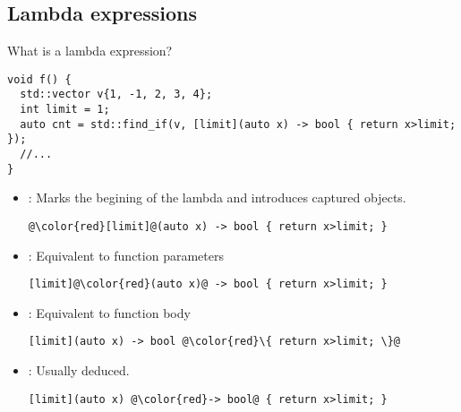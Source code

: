 \subsection{Lambda expressions}

\begin{frame}[t,fragile]{What is a lambda expression?}
\begin{lstlisting}
void f() {
  std::vector v{1, -1, 2, 3, 4};
  int limit = 1;
  auto cnt = std::find_if(v, [limit](auto x) -> bool { return x>limit; });
  //...
}
\end{lstlisting}
\begin{itemize}
  \item {}: Marks the begining of the lambda and introduces
        captured objects.
\begin{lstlisting}[escapechar=@]
@\color{red}[limit]@(auto x) -> bool { return x>limit; }
\end{lstlisting}

  \item {}: Equivalent to function parameters
\begin{lstlisting}[escapechar=@]
[limit]@\color{red}(auto x)@ -> bool { return x>limit; }
\end{lstlisting}

  \item {}: Equivalent to function body
\begin{lstlisting}[escapechar=@]
[limit](auto x) -> bool @\color{red}\{ return x>limit; \}@
\end{lstlisting}

  \item {}: Usually deduced.
\begin{lstlisting}[escapechar=@]
[limit](auto x) @\color{red}-> bool@ { return x>limit; }
\end{lstlisting}

\end{itemize}
\end{frame}

